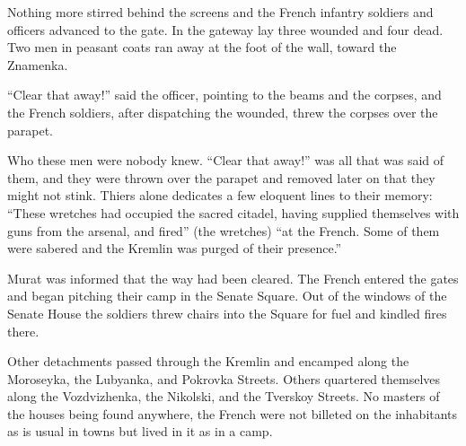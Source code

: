 Nothing more stirred behind the screens and the French infantry
soldiers and officers advanced to the gate. In the gateway lay
three wounded and four dead. Two men in peasant coats ran away at
the foot of the wall, toward the Znamenka.

``Clear that away!'' said the officer, pointing to the beams and
the corpses, and the French soldiers, after dispatching the
wounded, threw the corpses over the parapet.

Who these men were nobody knew. ``Clear that away!'' was all that
was said of them, and they were thrown over the parapet and
removed later on that they might not stink. Thiers alone
dedicates a few eloquent lines to their memory: ``These wretches
had occupied the sacred citadel, having supplied themselves with
guns from the arsenal, and fired'' (the wretches) ``at the
French. Some of them were sabered and the Kremlin was purged of
their presence.''

Murat was informed that the way had been cleared. The French
entered the gates and began pitching their camp in the Senate
Square. Out of the windows of the Senate House the soldiers threw
chairs into the Square for fuel and kindled fires there.

Other detachments passed through the Kremlin and encamped along
the Moroseyka, the Lubyanka, and Pokrovka Streets. Others
quartered themselves along the Vozdvizhenka, the Nikolski, and
the Tverskoy Streets. No masters of the houses being found
anywhere, the French were not billeted on the inhabitants as is
usual in towns but lived in it as in a camp.

